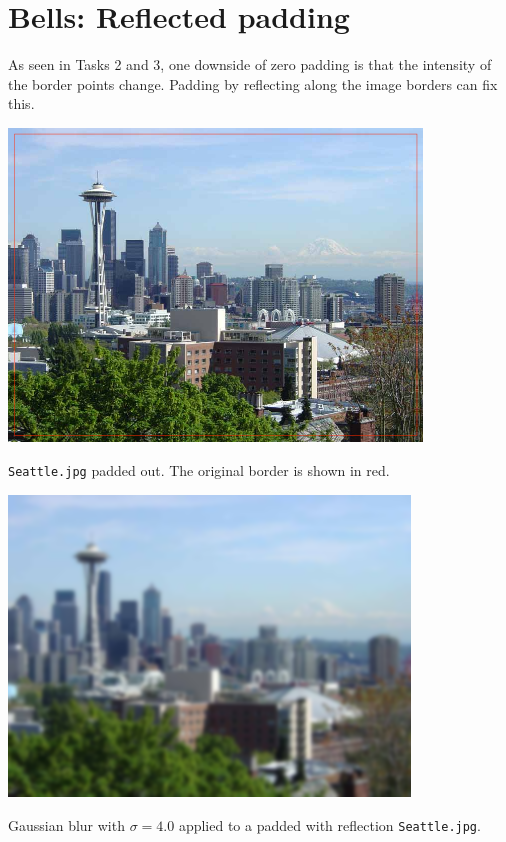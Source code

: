 \documentclass[letterpaper]{article}
\begin{document}
\section*{Bells: Reflected padding}

As seen in Tasks 2 and 3, one downside of zero padding is that the intensity of
the border points change. Padding by reflecting along the image borders can fix
this.

\begin{center}
  \includegraphics[width=0.824\textwidth]{reflectedpaddingtaskborder.png}
  
  \texttt{Seattle.jpg} padded out. The original border is shown in red.
\end{center}

\begin{center}
  \includegraphics[width=0.8\textwidth]{reflectedgaussianblur.png}
  
  Gaussian blur with $\sigma = 4.0$ applied to a padded with reflection \texttt{Seattle.jpg}.
\end{center}
\end{document}
